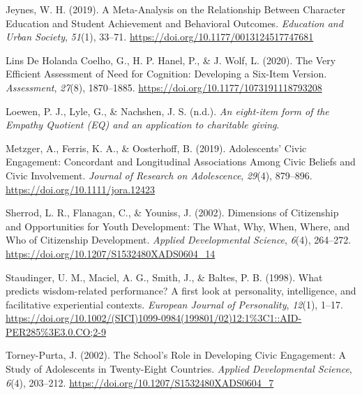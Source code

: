 \documentclass[
  man,
  floatsintext,
  longtable,
  nolmodern,
  notxfonts,
  notimes,
  colorlinks=true,linkcolor=blue,citecolor=blue,urlcolor=blue]{apa7}
\newlength{\cslhangindent}
\newenvironment{CSLReferences}[2] %
 {\begin{list}{}{%
  \setlength{\itemindent}{0pt}
  \setlength{\leftmargin}{0pt}
  \setlength{\parsep}{0pt}
  \ifodd #1
   \setlength{\leftmargin}{\cslhangindent}
   \setlength{\itemindent}{-1\cslhangindent}
  \fi
  \setlength{\itemsep}{#2\baselineskip}}}
 {\end{list}}
\begin{document}
\begin{CSLReferences}{1}{0}
Jeynes, W. H. (2019). A {Meta-Analysis} on the {Relationship Between
Character Education} and {Student Achievement} and {Behavioral
Outcomes}. \emph{Education and Urban Society}, \emph{51}(1), 33--71.
\url{https://doi.org/10.1177/0013124517747681}

Lins De Holanda Coelho, G., H. P. Hanel, P., \& J. Wolf, L. (2020). The
{Very Efficient Assessment} of {Need} for {Cognition}: {Developing} a
{Six-Item Version}. \emph{Assessment}, \emph{27}(8), 1870--1885.
\url{https://doi.org/10.1177/1073191118793208}

Loewen, P. J., Lyle, G., \& Nachshen, J. S. (n.d.). \emph{An eight-item
form of the {Empathy Quotient} ({EQ}) and an application to charitable
giving}.

Metzger, A., Ferris, K. A., \& Oosterhoff, B. (2019). Adolescents'
{Civic Engagement}: {Concordant} and {Longitudinal Associations Among
Civic Beliefs} and {Civic Involvement}. \emph{Journal of Research on
Adolescence}, \emph{29}(4), 879--896.
\url{https://doi.org/10.1111/jora.12423}

Sherrod, L. R., Flanagan, C., \& Youniss, J. (2002). Dimensions of
{Citizenship} and {Opportunities} for {Youth Development}: {The What},
{Why}, {When}, {Where}, and {Who} of {Citizenship Development}.
\emph{Applied Developmental Science}, \emph{6}(4), 264--272.
\url{https://doi.org/10.1207/S1532480XADS0604_14}

Staudinger, U. M., Maciel, A. G., Smith, J., \& Baltes, P. B. (1998).
What predicts wisdom-related performance? {A} first look at personality,
intelligence, and facilitative experiential contexts. \emph{European
Journal of Personality}, \emph{12}(1), 1--17.
\url{https://doi.org/10.1002/(SICI)1099-0984(199801/02)12:1\%3C1::AID-PER285\%3E3.0.CO;2-9}

Torney-Purta, J. (2002). The {School}'s {Role} in {Developing Civic
Engagement}: {A Study} of {Adolescents} in {Twenty-Eight Countries}.
\emph{Applied Developmental Science}, \emph{6}(4), 203--212.
\url{https://doi.org/10.1207/S1532480XADS0604_7}


\end{CSLReferences}
\end{document}
